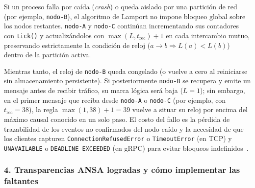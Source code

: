 \documentclass[12pt,a4paper]{article}
\begin{document}
Si un proceso falla por caída (\emph{crash}) o queda aislado por una partición de red (por ejemplo, \texttt{nodo-B}), el algoritmo de Lamport no impone bloqueo global sobre los nodos restantes. \texttt{nodo-A} y \texttt{nodo-C} continúan incrementando sus contadores con \texttt{tick()} y actualizándolos con $\operatorname{max}(L, t_{\mathrm{rec}}) + 1$ en cada intercambio mutuo, preservando estrictamente la condición de reloj ($a \rightarrow b \Rightarrow L(a) < L(b)$) dentro de la partición activa.

Mientras tanto, el reloj de \texttt{nodo-B} queda congelado (o vuelve a cero al reiniciarse sin almacenamiento persistente). Si posteriormente \texttt{nodo-B} se recupera y emite un mensaje antes de recibir tráfico, su marca lógica será baja ($L = 1$); sin embargo, en el primer mensaje que reciba desde \texttt{nodo-A} o \texttt{nodo-C} (por ejemplo, con $t_{\mathrm{rec}} = 38$), la regla $\operatorname{max}(1, 38) + 1 = 39$ vuelve a situar su reloj por encima del máximo causal conocido en un solo paso. El costo del fallo es la pérdida de trazabilidad de los eventos no confirmados del nodo caído y la necesidad de que los clientes capturen \texttt{ConnectionRefusedError} o \texttt{TimeoutError} (en TCP) y \texttt{UNAVAILABLE} o \texttt{DEADLINE\_EXCEEDED} (en gRPC) para evitar bloqueos indefinidos~\cite{mohammad2025resilient}.

\subsubsection{4. Transparencias ANSA logradas y cómo implementar las faltantes}
\end{document}
